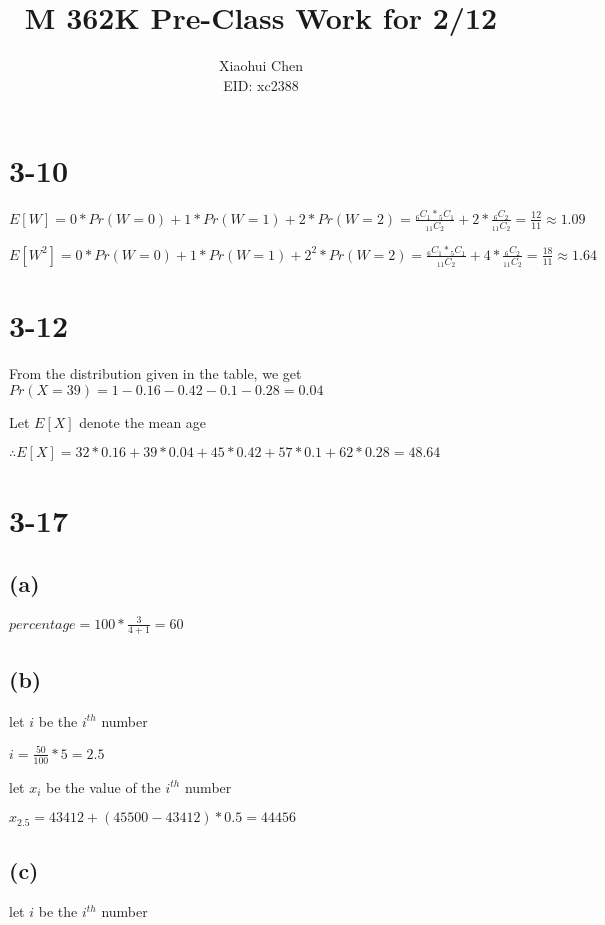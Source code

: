 \documentclass[12pt]{article}
\author{Xiaohui Chen \\EID: xc2388}
\title{M 362K Pre-Class Work for 2/12}
\begin{document}
\maketitle
\begin{spacing}{2.0}

\section*{3-10}

$E[W]=0*Pr(W=0)+ 1*Pr(W=1)+ 2*Pr(W=2)=\frac{{}_{6}C_{1}*{}_{5}C_{1}}{{}_{11}C_{2}}+ 2*\frac{{}_{6}C_{2}}{{}_{11}C_{2}}= \frac{12}{11} \approx 1.09$

$E[W^2] = 0*Pr(W=0)+ 1*Pr(W=1)+ 2^2*Pr(W=2)=\frac{{}_{6}C_{1}*{}_{5}C_{1}}{{}_{11}C_{2}}+ 4*\frac{{}_{6}C_{2}}{{}_{11}C_{2}}= \frac{18}{11} \approx 1.64$

\section*{3-12}

From the distribution given in the table, we get $Pr(X=39)=1- 0.16 -0.42-0.1-0.28=0.04$

Let $E[X]$ denote the mean age

$\therefore E[X]=32*0.16+39*0.04+45*0.42+57*0.1+62*0.28= 48.64$

\section*{3-17}

\subsection*{(a)}
$percentage=100*\frac{3}{4+1}=60$

\subsection*{(b)}
let $i$ be the $i^{th}$ number

$i=\frac{50}{100}*5=2.5$

let $x_{i}$ be the value of the $i^{th}$ number

$x_{2.5}=43412+(45500-43412)*0.5=44456$

\subsection*{(c)}
let $i$ be the $i^{th}$ number


\end{spacing}
\end{document}

